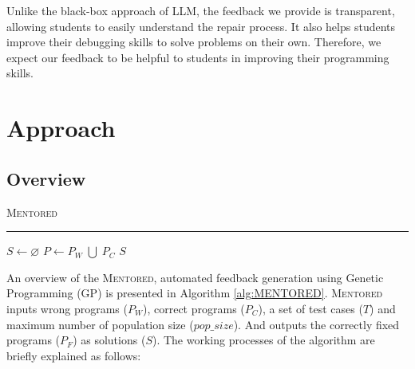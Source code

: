 \documentclass[10pt,conference]{IEEEtran}
\newcommand{\hrulealg}[0]{\vspace{1mm} \hrule \vspace{1mm}}
\begin{document}
        Unlike the black-box approach of LLM, the feedback we provide is transparent, allowing students to easily understand the repair process. It also helps students improve their debugging skills to solve problems on their own. Therefore, we expect our feedback to be helpful to students in improving their programming skills.
        


\section{Approach}

    \subsection{Overview}
        \begin{algorithm}[h]
            \caption{\textsc{Mentored}} \label{alg:MENTORED}
            \hrulealg
            $S \gets \varnothing$\;
            $P \gets P_{W}\;\bigcup\;P_{C}$ 
            \Return $S$
        \end{algorithm}

        An overview of the \textsc{Mentored}, automated feedback generation using Genetic Programming (GP) is presented in Algorithm \ref{alg:MENTORED}. \textsc{Mentored} inputs wrong programs ($P_{W}$), correct programs ($P_{C}$), a set of test cases ($T$) and maximum number of population size ($pop\_size$). And outputs the correctly fixed programs ($P_{F}$) as solutions ($S$). The working processes of the algorithm are briefly explained as follows:
\end{document}
